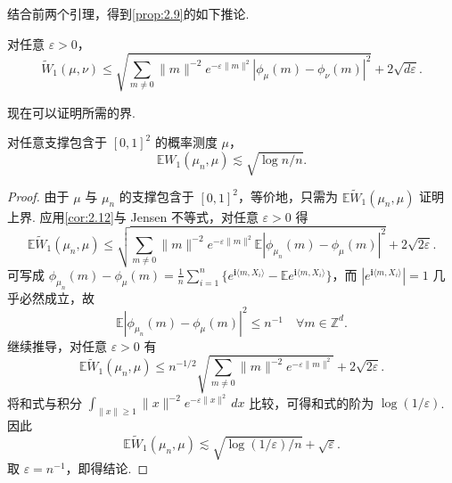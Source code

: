 结合前两个引理，得到\autoref{prop:2.9}的如下推论.
\begin{corollary}\label{cor:2.12}
对任意 $\varepsilon>0$，
$$\widetilde W_1(\mu,\nu)\le\sqrt{\sum_{m\ne0}\lVert m\rVert^{-2}e^{-\varepsilon\lVert m\rVert^2}|\phi_\mu(m)-\phi_\nu(m)|^2}+2\sqrt{d\varepsilon}.$$
\end{corollary}
现在可以证明所需的界.
\begin{theorem}\label{thm:2.13}
对任意支撑包含于 $[0,1]^2$ 的概率测度 $\mu$，
$$\mathbb EW_1(\mu_n,\mu)\lesssim\sqrt{\log n/n}.$$
\end{theorem}
\begin{proof}
由于 $\mu$ 与 $\mu_n$ 的支撑包含于 $[0,1]^2$，等价地，只需为 $\mathbb E\widetilde W_1(\mu_n,\mu)$ 证明上界. 应用\autoref{cor:2.12}与 Jensen 不等式，对任意 $\varepsilon>0$ 得
$$\mathbb E\widetilde W_1(\mu_n,\mu)\le
\sqrt{\sum_{m\ne0}\lVert m\rVert^{-2}e^{-\varepsilon\lVert m\rVert^2}\mathbb E|\phi_{\mu_n}(m)-\phi_\mu(m)|^2}+2\sqrt{2\varepsilon}.$$
可写成 $\phi_{\mu_n}(m)-\phi_\mu(m)=\frac1n\sum_{i=1}^n\{e^{\mathbf i\langle m,X_i\rangle}-\mathbb Ee^{\mathbf i\langle m,X_i\rangle}\}$，而 $|e^{\mathbf i\langle m,X_i\rangle}|=1$ 几乎必然成立，故
\begin{equation}\label{eq:2.12}
\mathbb E|\phi_{\mu_n}(m)-\phi_\mu(m)|^2\le n^{-1}\quad\forall m\in\mathbb Z^d.
\end{equation}
继续推导，对任意 $\varepsilon>0$ 有
\begin{equation}\label{eq:2.13}
\mathbb E\widetilde W_1(\mu_n,\mu)\le n^{-1/2}\sqrt{\sum_{m\ne0}\lVert m\rVert^{-2}e^{-\varepsilon\lVert m\rVert^2}}+2\sqrt{2\varepsilon}.
\end{equation}
将和式与积分 $\int_{\lVert x\rVert\ge1}\lVert x\rVert^{-2}e^{-\varepsilon\lVert x\rVert^2}\,dx$ 比较，可得和式的阶为 $\log(1/\varepsilon)$. 因此
$$\mathbb E\widetilde W_1(\mu_n,\mu)\lesssim\sqrt{\log(1/\varepsilon)/n}+\sqrt\varepsilon.$$
取 $\varepsilon=n^{-1}$，即得结论.
\end{proof}
